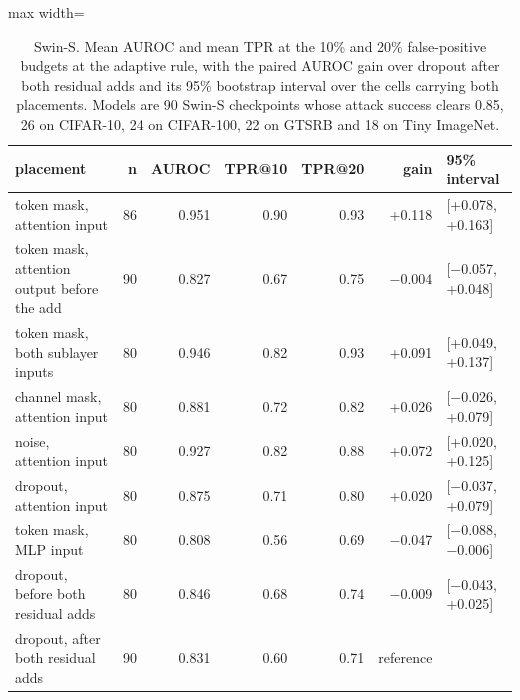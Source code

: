 \begin{table}[htbp]
\centering
\small
\caption{Swin-S. Mean AUROC and mean TPR at the 10\% and 20\% false-positive budgets at the adaptive rule, with the paired AUROC gain over dropout after both residual adds and its 95\% bootstrap interval over the cells carrying both placements. Models are 90 Swin-S checkpoints whose attack success clears 0.85, 26 on CIFAR-10, 24 on CIFAR-100, 22 on GTSRB and 18 on Tiny ImageNet.}
\label{tab:swin-main}
\begin{adjustbox}{max width=\linewidth}
\begin{tabular}{lrrrrrl}
\toprule
placement & n & AUROC & TPR@10 & TPR@20 & gain & 95\% interval \\
\midrule
token mask, attention input & 86 & 0.951 & 0.90 & 0.93 & +0.118 & [+0.078, +0.163] \\
token mask, attention output before the add & 90 & 0.827 & 0.67 & 0.75 & $-$0.004 & [$-$0.057, +0.048] \\
token mask, both sublayer inputs & 80 & 0.946 & 0.82 & 0.93 & +0.091 & [+0.049, +0.137] \\
channel mask, attention input & 80 & 0.881 & 0.72 & 0.82 & +0.026 & [$-$0.026, +0.079] \\
noise, attention input & 80 & 0.927 & 0.82 & 0.88 & +0.072 & [+0.020, +0.125] \\
dropout, attention input & 80 & 0.875 & 0.71 & 0.80 & +0.020 & [$-$0.037, +0.079] \\
token mask, MLP input & 80 & 0.808 & 0.56 & 0.69 & $-$0.047 & [$-$0.088, $-$0.006] \\
dropout, before both residual adds & 80 & 0.846 & 0.68 & 0.74 & $-$0.009 & [$-$0.043, +0.025] \\
dropout, after both residual adds & 90 & 0.831 & 0.60 & 0.71 & reference &  \\
\bottomrule
\end{tabular}
\end{adjustbox}
\end{table}
